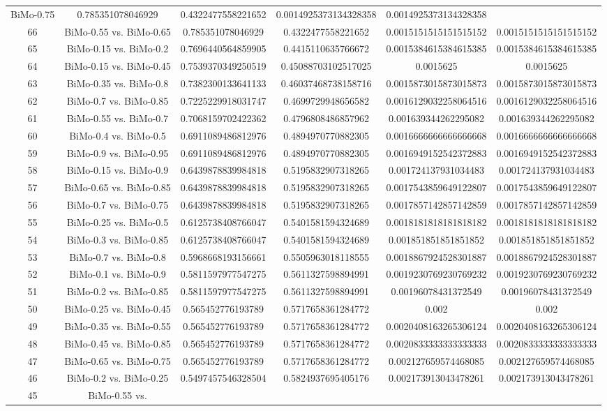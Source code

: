 \documentclass[a4paper,10pt]{article}
\begin{document}
\begin{landscape}
\begin{table}[!htp]
\begin{tabular}{cccccc}
BiMo-0.75&0.785351078046929&0.4322477558221652&0.0014925373134328358&0.0014925373134328358\\66&BiMo-0.55 vs. BiMo-0.65&0.785351078046929&0.4322477558221652&0.0015151515151515152&0.0015151515151515152\\65&BiMo-0.15 vs. BiMo-0.2&0.7696440564859905&0.4415110635766672&0.0015384615384615385&0.0015384615384615385\\64&BiMo-0.15 vs. BiMo-0.45&0.7539370349250519&0.45088703102517025&0.0015625&0.0015625\\63&BiMo-0.35 vs. BiMo-0.8&0.7382300133641133&0.46037468738158716&0.0015873015873015873&0.0015873015873015873\\62&BiMo-0.7 vs. BiMo-0.85&0.7225229918031747&0.4699729948656582&0.0016129032258064516&0.0016129032258064516\\61&BiMo-0.55 vs. BiMo-0.7&0.7068159702422362&0.4796808486857962&0.001639344262295082&0.001639344262295082\\60&BiMo-0.4 vs. BiMo-0.5&0.6911089486812976&0.4894970770882305&0.0016666666666666668&0.0016666666666666668\\59&BiMo-0.9 vs. BiMo-0.95&0.6911089486812976&0.4894970770882305&0.0016949152542372883&0.0016949152542372883\\58&BiMo-0.15 vs. BiMo-0.9&0.6439878839984818&0.5195832907318265&0.001724137931034483&0.001724137931034483\\57&BiMo-0.65 vs. BiMo-0.85&0.6439878839984818&0.5195832907318265&0.0017543859649122807&0.0017543859649122807\\56&BiMo-0.7 vs. BiMo-0.75&0.6439878839984818&0.5195832907318265&0.0017857142857142859&0.0017857142857142859\\55&BiMo-0.25 vs. BiMo-0.5&0.6125738408766047&0.5401581594324689&0.0018181818181818182&0.0018181818181818182\\54&BiMo-0.3 vs. BiMo-0.85&0.6125738408766047&0.5401581594324689&0.001851851851851852&0.001851851851851852\\53&BiMo-0.7 vs. BiMo-0.8&0.5968668193156661&0.5505963018118555&0.0018867924528301887&0.0018867924528301887\\52&BiMo-0.1 vs. BiMo-0.9&0.5811597977547275&0.5611327598894991&0.0019230769230769232&0.0019230769230769232\\51&BiMo-0.2 vs. BiMo-0.85&0.5811597977547275&0.5611327598894991&0.00196078431372549&0.00196078431372549\\50&BiMo-0.25 vs. BiMo-0.45&0.565452776193789&0.5717658361284772&0.002&0.002\\49&BiMo-0.35 vs. BiMo-0.55&0.565452776193789&0.5717658361284772&0.0020408163265306124&0.0020408163265306124\\48&BiMo-0.45 vs. BiMo-0.85&0.565452776193789&0.5717658361284772&0.0020833333333333333&0.0020833333333333333\\47&BiMo-0.65 vs. BiMo-0.75&0.565452776193789&0.5717658361284772&0.002127659574468085&0.002127659574468085\\46&BiMo-0.2 vs. BiMo-0.25&0.5497457546328504&0.5824937695405176&0.002173913043478261&0.002173913043478261\\45&BiMo-0.55 vs. 
\end{tabular}
\end{table}
\end{landscape}
\end{document}
